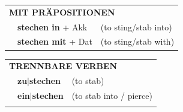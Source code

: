\documentclass[10pt,a4paper]{revtex4-2}
\begin{document}
\begin{verbbox}
   \vspace{10pt}

   \begin{tabular}{lll}
      \multicolumn{3}{l}{\textbf{MIT PRÄPOSITIONEN}}\\
& \textbf{stechen in} + Akk & (to sting/stab into)\\
& \textbf{stechen mit} + Dat & (to sting/stab with)\\
\end{tabular}
  \hfill
   \begin{tabular}{lll}
      \multicolumn{3}{l}{\textbf{TRENNBARE VERBEN}}\\
 & \textbf{zu$|$stechen} & (to stab)\\
 & \textbf{ein$|$stechen} & (to stab into / pierce)\\
\vspace{10pt}
  \end{tabular}

  \vspace{-5pt}

\end{verbbox}
\end{document}
